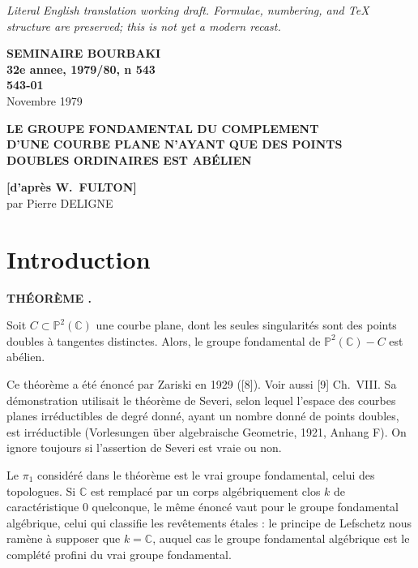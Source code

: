\documentclass[12pt,a4paper]{article}
\newcounter{mainthm}
\newenvironment{maintheorem}[1][]{%
  \refstepcounter{mainthm}%
  \par\medskip\noindent\textbf{THÉORÈME \themainthm#1.}~\ignorespaces
}{\par\medskip}
\begin{document}
\begin{center}\small\emph{Literal English translation working draft. Formulae, numbering, and TeX structure are preserved; this is not yet a modern recast.}\end{center}
\vspace{0.5em}

\setlength{\parindent}{0pt}
\setlength{\parskip}{0.5ex more 0.2ex minus 0.1ex}

\begin{center}
\textbf{SEMINAIRE BOURBAKI}\\
\textbf{32e annee, 1979/80, n 543}\\
\textbf{543-01}\\[1ex]
Novembre 1979
\end{center}

\begin{center}
\Large\bfseries
LE GROUPE FONDAMENTAL DU COMPLEMENT\\
D'UNE COURBE PLANE N'AYANT QUE DES POINTS\\
DOUBLES ORDINAIRES EST ABÉLIEN
\end{center}

\begin{center}
\textbf{[d'après W.\ FULTON]}\\[1ex]
par Pierre DELIGNE
\end{center}

\section*{Introduction}

\begin{maintheorem}
Soit $C \subset \mathbb{P}^2(\mathbb{C})$ une courbe plane, dont les seules singularités sont des points doubles à tangentes distinctes. Alors, le groupe fondamental de $\mathbb{P}^2(\mathbb{C}) - C$ est abélien.
\end{maintheorem}

Ce théorème a été énoncé par Zariski en 1929 ([8]). Voir aussi [9] Ch.\ VIII. Sa démonstration utilisait le théorème de Severi, selon lequel l'espace des courbes planes irréductibles de degré donné, ayant un nombre donné de points doubles, est irréductible (Vorlesungen über algebraische Geometrie, 1921, Anhang F). On ignore toujours si l'assertion de Severi est vraie ou non.

Le $\pi_1$ considéré dans le théorème est le vrai groupe fondamental, celui des topologues. Si $\mathbb{C}$ est remplacé par un corps algébriquement clos $k$ de caractéristique $0$ quelconque, le même énoncé vaut pour le groupe fondamental algébrique, celui qui classifie les revêtements étales : le principe de Lefschetz nous ramène à supposer que $k = \mathbb{C}$, auquel cas le groupe fondamental algébrique est le complété profini du vrai groupe fondamental.
\end{document}
